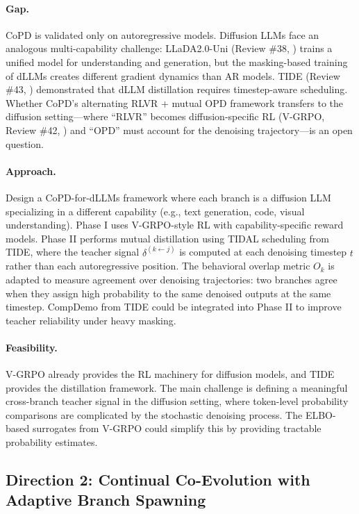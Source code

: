 \documentclass[11pt]{article}
\begin{document}
\paragraph{Gap.}
CoPD is validated only on autoregressive models. Diffusion LLMs face an analogous multi-capability challenge: LLaDA2.0-Uni (Review \#38, \cite{llada2uni}) trains a unified model for understanding and generation, but the masking-based training of dLLMs creates different gradient dynamics than AR models. TIDE (Review \#43, \cite{tide}) demonstrated that dLLM distillation requires timestep-aware scheduling. Whether CoPD's alternating RLVR + mutual OPD framework transfers to the diffusion setting---where ``RLVR'' becomes diffusion-specific RL (V-GRPO, Review \#42, \cite{vgrpo}) and ``OPD'' must account for the denoising trajectory---is an open question.

\paragraph{Approach.}
Design a CoPD-for-dLLMs framework where each branch is a diffusion LLM specializing in a different capability (e.g., text generation, code, visual understanding). Phase I uses V-GRPO-style RL with capability-specific reward models. Phase II performs mutual distillation using TIDAL scheduling from TIDE, where the teacher signal $\delta^{(k \leftarrow j)}$ is computed at each denoising timestep $t$ rather than each autoregressive position. The behavioral overlap metric $O_k$ is adapted to measure agreement over denoising trajectories: two branches agree when they assign high probability to the same denoised outputs at the same timestep. CompDemo from TIDE could be integrated into Phase II to improve teacher reliability under heavy masking.

\paragraph{Feasibility.}
V-GRPO already provides the RL machinery for diffusion models, and TIDE provides the distillation framework. The main challenge is defining a meaningful cross-branch teacher signal in the diffusion setting, where token-level probability comparisons are complicated by the stochastic denoising process. The ELBO-based surrogates from V-GRPO could simplify this by providing tractable probability estimates.

\subsection{Direction 2: Continual Co-Evolution with Adaptive Branch Spawning}
\end{document}
